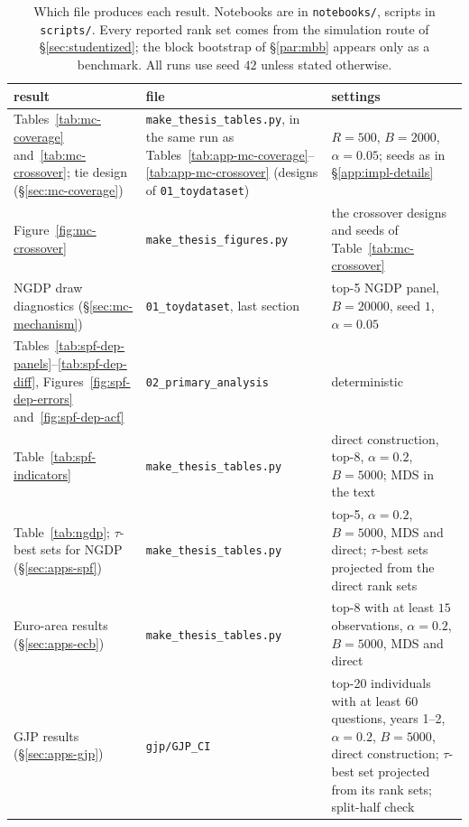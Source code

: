 \begin{table}[htb]
  \centering
  \caption[Which file produces each result]{Which file produces each result.
  Notebooks are in \texttt{notebooks/}, scripts in \texttt{scripts/}. Every reported
  rank set comes from the simulation route of \S\ref{sec:studentized}; the block
  bootstrap of \S\ref{par:mbb} appears only as a benchmark. All runs use seed $42$
  unless stated otherwise.}
  \label{tab:impl-repro}
  \small
  \begin{tabular}{p{4.2cm}p{4.6cm}p{5.0cm}}
    \toprule
    result & file & settings\\
    \midrule
    Tables~\ref{tab:mc-coverage} and~\ref{tab:mc-crossover}; tie design
    (\S\ref{sec:mc-coverage})
      & \texttt{make\_thesis\_tables.py}, in the same run as
        Tables~\ref{tab:app-mc-coverage}--\ref{tab:app-mc-crossover}
        (designs of \texttt{01\_toydataset})
      & $R=500$, $B=2000$, $\alpha=0.05$; seeds as in \S\ref{app:impl-details}\\
    Figure~\ref{fig:mc-crossover}
      & \texttt{make\_thesis\_figures.py}
      & the crossover designs and seeds of Table~\ref{tab:mc-crossover}\\
    NGDP draw diagnostics (\S\ref{sec:mc-mechanism})
      & \texttt{01\_toydataset}, last section
      & top-5 NGDP panel, $B=20000$, seed $1$, $\alpha=0.05$\\
    Tables~\ref{tab:spf-dep-panels}--\ref{tab:spf-dep-diff},
    Figures~\ref{fig:spf-dep-errors} and~\ref{fig:spf-dep-acf}
      & \texttt{02\_primary\_analysis}
      & deterministic\\
    Table~\ref{tab:spf-indicators}
      & \texttt{make\_thesis\_tables.py}
      & direct construction, top-8, $\alpha=0.2$, $B=5000$; MDS in the text\\
    Table~\ref{tab:ngdp}; $\tau$-best sets for NGDP (\S\ref{sec:apps-spf})
      & \texttt{make\_thesis\_tables.py}
      & top-5, $\alpha=0.2$, $B=5000$, MDS and direct; $\tau$-best sets projected
        from the direct rank sets\\
    Euro-area results (\S\ref{sec:apps-ecb})
      & \texttt{make\_thesis\_tables.py}
      & top-8 with at least $15$ observations, $\alpha=0.2$, $B=5000$, MDS and direct\\
    GJP results (\S\ref{sec:apps-gjp})
      & \texttt{gjp/GJP\_CI}
      & top-20 individuals with at least $60$ questions, years 1--2,
        $\alpha=0.2$, $B=5000$, direct construction; $\tau$-best set projected from
        its rank sets; split-half check\\

\end{tabular}
\end{table}
